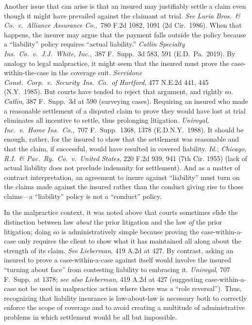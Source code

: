 \documentclass[
  12pt,
  letterpaper,
]{scrartcl}
\begin{document}
Another issue that can arise is that an insured may justifiably settle a claim
even though it might have prevailed against the claimant at trial. \textit{See}
\textit{Luria Bros.~\& Co.~v.~Alliance Assurance Co.},~780 F.2d 1082, 1091 (2d
Cir.~1986). When that happens, the insurer may argue that the payment falls
outside the policy because a ``liability'' policy requires ``actual
liability.'' \textit{Catlin Specialty Ins.~Co.~v.~J.J.~White, Inc.},~387
F.~Supp.~3d 583, 591 (E.D.~Pa.~2019). By analogy to legal
malpractice, it might seem that the insured must prove the case-within-the-case
in the coverage suit. \textit{Servidone Const.~Corp.~v.~Security~Ins.~Co.~of
Hartford}, 477 N.E.2d 441, 445 (N.Y.~1985). But courts have tended to reject
that argument, and rightly so. \textit{Catlin}, 387 F.~Supp.~3d at 590 (surveying cases).
Requiring an insured who made a reasonable settlement of a disputed claim to prove
they would have lost at trial eliminates all incentive to settle, thus prolonging
litigation. \textit{Uniroyal, Inc.~v.~Home Ins.~Co.},~707 F.~Supp.~1368,
1378 (E.D.N.Y.~1988). It should be enough, rather, for the insured to show that the settlement was
reasonable and that the claim, if successful, would have resulted in covered liability. \textit{Id.}; \textit{Chicago, R.I.~\&
Pac.~Ry.~Co.~v.~United States}, 220 F.2d 939, 941 (7th Cir. 1955) (lack of
actual liability does not preclude indemnity for settlement). And as a matter of contract interpretation, an agreement to insure against ``liability'' must turn on the claims made
against the insured rather than the conduct giving rise to those claims---a ``liability'' policy is not a ``conduct'' policy.

In the malpractice context, it was noted above that courts sometimes elide the
distinction between law \textit{about} the prior litigation and the law
\textit{of} the prior litigation; doing so is administratively simple because
proving the case-within-a-case only requires the client to show what it has
maintained all along about the strength of its claim. \textit{See}
\textit{Lieberman}, 419 A.2d at 427. By contrast, asking an insured to prove a
case-within-a-case against itself would involve the insured ``turning about
face'' from contesting liability to embracing it. \textit{Uniroyal}, 707
F.~Supp.~at 1378;
\textit{see also} \textit{Lieberman}, 419 A.2d at 427 (suggesting
case-within-a-case not be used in malpractice action where there was a ``role
reversal''). Thus, recognizing that liability insurance is law-about-law is
necessary both to correctly enforce the scope of coverage and to avoid creating
a multitude of administrative problems in which settlement would be all but
impossible.
\end{document}
